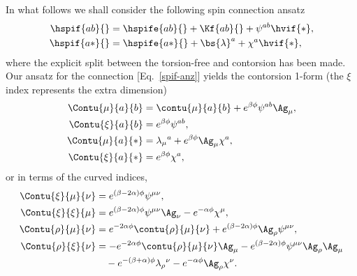 \documentclass[aps,prd,12pt,superscriptaddress,showpacs,showkeys,reprint]{revtex4-1}
\begin{document}
In what follows we shall consider the following spin connection ansatz
\begin{equation}
  \label{spif-anz}
  \begin{split}
    \hspif{ab}{} &= \hspife{ab}{} + \Kf{ab}{} + \psi^{ab} \hvif{*}, \\
    \hspif{a*}{} &= \hspife{a*}{} + \bs{\lambda}^a + \chi^a \hvif{*},
  \end{split}
\end{equation}
where the explicit split between the torsion-free and contorsion has been made. Our ansatz for the connection [Eq.~\eqref{spif-anz}] yields the contorsion 1-form (the $\xi$ index represents the extra dimension)
\begin{align}
  \Contu{\mu}{a}{b} &= \contu{\mu}{a}{b} + e^{\beta \phi} \psi^{ab} \Ag_\mu, \\
  \Contu{\xi}{a}{b} &= e^{\beta \phi} \psi^{ab}, \\
  \Contu{\mu}{a}{*} &= \lambda_\mu{}^a + e^{\beta \phi} \Ag_\mu \chi^a, \\
  \Contu{\xi}{a}{*} &= e^{\beta \phi} \chi^{a},
\end{align}
or in terms of the curved indices,
\begin{align}
  \Contu{\xi}{\mu}{\nu} &= e^{(\beta - 2\alpha)\phi} \psi^{\mu\nu}, \\
  \Contu{\xi}{\xi}{\mu} &= e^{(\beta - 2\alpha)\phi} \psi^{\mu\nu} \Ag_\nu - e^{-\alpha \phi} \chi^\mu, \\
  \Contu{\rho}{\mu}{\nu} &= e^{ - 2\alpha \phi} \contu{\rho}{\mu}{\nu} + e^{(\beta - 2\alpha)\phi} \Ag_\rho \psi^{\mu\nu}, \\
  \Contu{\rho}{\xi}{\nu} &= - e^{ - 2\alpha \phi} \contu{\rho}{\mu}{\nu} \Ag_\mu - e^{(\beta - 2\alpha)\phi} \psi^{\mu\nu} \Ag_\rho \Ag_\mu \\
  & \quad - e^{ - (\beta +\alpha) \phi} \lambda_\rho{}^\nu - e^{ - \alpha \phi} \Ag_\rho \chi^\nu. \notag
\end{align}
\end{document}
